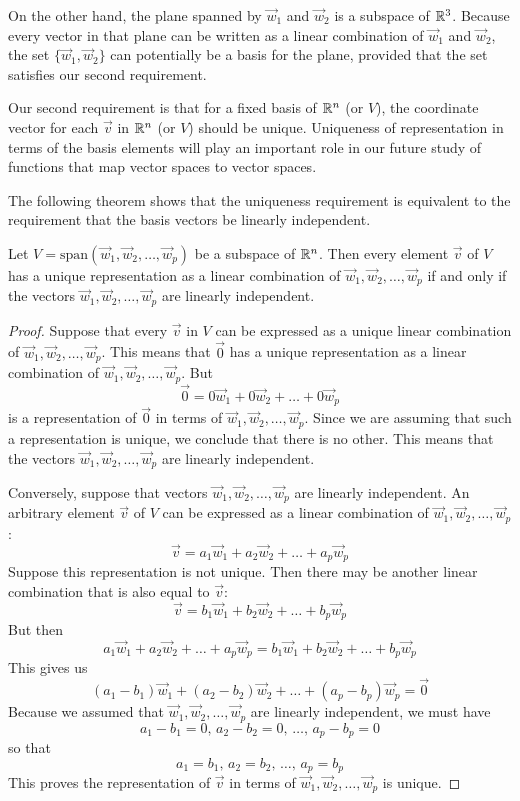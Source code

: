 \documentclass{ximera}
\begin{document}
On the other hand, the plane spanned by $\vec{w}_1$ and $\vec{w}_2$ is a subspace of $\mathbb{R}^3$.  Because every vector in that plane can be written as a linear combination of $\vec{w}_1$ and $\vec{w}_2$, the set $\{\vec{w}_1, \vec{w}_2\}$ can potentially be a basis for the plane, provided that the set satisfies our second requirement.

Our second requirement is that for a fixed basis of $\mathbb{R}^n$ (or $V$), the coordinate vector for each $\vec{v}$ in $\mathbb{R}^n$ (or $V$) should be unique.  Uniqueness of representation in terms of the basis elements will play an important role in our future study of functions that map vector spaces to vector spaces.

The following theorem shows that the uniqueness requirement is equivalent to the requirement that the basis vectors be linearly independent.  %

\begin{theorem}\label{th:linindbasis}
Let $V=\mbox{span}(\vec{w}_1, \vec{w}_2,\ldots,\vec{w}_p)$ be a subspace of $\mathbb{R}^n$.  Then every element $\vec{v}$ of $V$ has a unique representation as a linear combination of  $\vec{w}_1, \vec{w}_2,\ldots,\vec{w}_p$ if and only if the vectors $\vec{w}_1, \vec{w}_2,\ldots,\vec{w}_p$ are linearly independent.
\end{theorem}
\begin{proof}
Suppose that every $\vec{v}$ in $V$ can be expressed as a unique linear combination of $\vec{w}_1, \vec{w}_2,\ldots,\vec{w}_p$.
This means that $\vec{0}$ has a unique representation as a linear combination of $\vec{w}_1, \vec{w}_2,\ldots,\vec{w}_p$.
But 
$$\vec{0}=0\vec{w}_1+0\vec{w}_2+\ldots+0\vec{w}_p$$
is a representation of $\vec{0}$ in terms of $\vec{w}_1, \vec{w}_2,\ldots,\vec{w}_p$.  Since we are assuming that such a representation is unique, we conclude that there is no other.  This means that the vectors $\vec{w}_1, \vec{w}_2,\ldots,\vec{w}_p$ are linearly independent.

Conversely, suppose that vectors $\vec{w}_1, \vec{w}_2,\ldots,\vec{w}_p$ are linearly independent.  An arbitrary element $\vec{v}$ of $V$ can be expressed as a linear combination of $\vec{w}_1, \vec{w}_2,\ldots,\vec{w}_p$:
$$\vec{v}=a_1\vec{w}_1+a_2\vec{w}_2+\ldots+a_p\vec{w}_p$$
Suppose this representation is not unique.  Then there may be another linear combination that is also equal to $\vec{v}$:
$$\vec{v}=b_1\vec{w}_1+b_2\vec{w}_2+\ldots+b_p\vec{w}_p$$
But then
$$a_1\vec{w}_1+a_2\vec{w}_2+\ldots+a_p\vec{w}_p=b_1\vec{w}_1+b_2\vec{w}_2+\ldots+b_p\vec{w}_p$$
This gives us
$$(a_1-b_1)\vec{w}_1+(a_2-b_2)\vec{w}_2+\ldots+(a_p-b_p)\vec{w}_p=\vec{0}$$
Because we assumed that $\vec{w}_1, \vec{w}_2,\ldots,\vec{w}_p$ are linearly independent, we must have
$$a_1-b_1=0,\, a_2-b_2=0,\,\ldots ,\,a_p-b_p=0$$
so that
$$a_1=b_1,\, a_2=b_2,\,\ldots ,\,a_p=b_p$$
This proves the representation of $\vec{v}$ in terms of $\vec{w}_1, \vec{w}_2,\ldots,\vec{w}_p$ is unique.

\end{proof}
\end{document}
